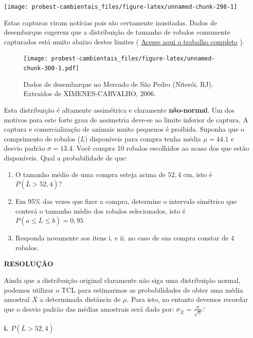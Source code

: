 \documentclass[
]{book}
\providecommand{\tightlist}{%
  \setlength{\itemsep}{0pt}\setlength{\parskip}{0pt}}
\begin{document}
\texttt{[image: probest-cambientais\_files/figure-latex/unnamed-chunk-298-1]}

Estas capturas viram notícias pois são certamente inusitadas. Dados de desembarque sugerem que a distribuição de tamanho de robalos comumente capturados está muito abaixo destes limites \citep{ximanes-carvalo2006} ( \href{http://repositorio.ufc.br/bitstream/riufc/1312/1/2006_dis_moxcarvalho.pdf}{Acesse aqui o trabalho completo} ).

\begin{figure}
\centering
\texttt{[image: probest-cambientais\_files/figure-latex/unnamed-chunk-300-1.pdf]}
\caption{\label{fig:unnamed-chunk-300}Dados de desembarque no Mercado de São Pedro (Niterói, RJ). Extraídos de XIMENES-CARVALHO, 2006.}
\end{figure}

Esta distribuição é altamente assimétrica e claramente \textbf{não-normal}. Um dos motivos para este forte grau de assimetria deve-se ao limite inferior de captura. A captura e comercialização de animais muito pequenos é proibida. Suponha que o comprimento de robalos (\(L\)) disponíveis para compra tenha média \(\mu = 44.1\) e desvio padrão \(\sigma = 13.4\). Você compra 10 robalos escolhidos ao acaso dos que estão disponíveis. Qual a probabilidade de que:

\begin{enumerate}
\def\labelenumi{\roman{enumi}.}
\tightlist
\item
  O tamanho médio de uma compra esteja acima de \(52,4\) cm, isto é \(P(\overline{L} > 52,4)\)?
\item
  Em \(95\%\) das vezes que fizer a compra, determine o intervalo simétrico que conterá o tamanho médio dos robalos selecionados, isto é \(P(a \le \overline{L} \le b) = 0,95\)
\item
  Responda novamente aos itens i. e ii. no caso de sua compra constar de \(4\) robalos.
\end{enumerate}

\textbf{RESOLUÇÃO}

Ainda que a distribuição original claramente não siga uma distribuição normal, podemos utilizar o TCL para estimarmos as probabilidades de obter uma média amostral \(\overline{X}\) a determinada distância de \(\mu\). Para isto, no entanto devemos recordar que o desvio padrão das médias amostrais será dado por: \(\sigma_{\overline{X}} = \frac{\sigma}{\sqrt{n}}\).`

\textbf{i. \(P(\overline{L} > 52,4)\)}
\end{document}
